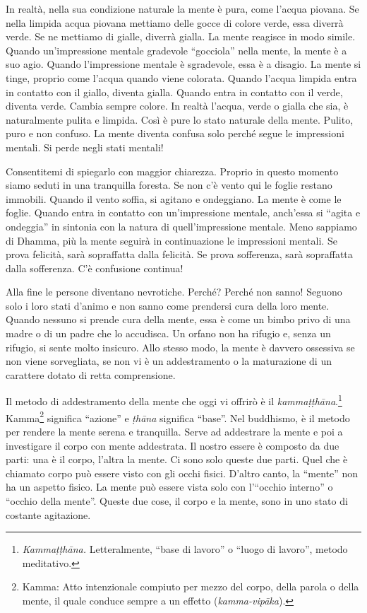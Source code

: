 In realtà, nella sua condizione naturale la mente è pura, come l'acqua
piovana. Se nella limpida acqua piovana mettiamo delle gocce di colore
verde, essa diverrà verde. Se ne mettiamo di gialle, diverrà gialla. La
mente reagisce in modo simile. Quando un'impressione mentale gradevole
``gocciola'' nella mente, la mente è a suo agio. Quando l'impressione
mentale è sgradevole, essa è a disagio. La mente si tinge, proprio come
l'acqua quando viene colorata. Quando l'acqua limpida entra in contatto
con il giallo, diventa gialla. Quando entra in contatto con il verde,
diventa verde. Cambia sempre colore. In realtà l'acqua, verde o gialla
che sia, è naturalmente pulita e limpida. Così è pure lo stato naturale
della mente. Pulito, puro e non confuso. La mente diventa confusa solo
perché segue le impressioni mentali. Si perde negli stati mentali!

Consentitemi di spiegarlo con maggior chiarezza. Proprio in questo
momento siamo seduti in una tranquilla foresta. Se non c'è vento qui le
foglie restano immobili. Quando il vento soffia, si agitano e
ondeggiano. La mente è come le foglie. Quando entra in contatto con
un'impressione mentale, anch'essa si ``agita e ondeggia'' in sintonia
con la natura di quell'impressione mentale. Meno sappiamo di Dhamma, più
la mente seguirà in continuazione le impressioni mentali. Se prova
felicità, sarà sopraffatta dalla felicità. Se prova sofferenza, sarà
sopraffatta dalla sofferenza. C'è confusione continua!

Alla fine le persone diventano nevrotiche. Perché? Perché non sanno!
Seguono solo i loro stati d'animo e non sanno come prendersi cura della
loro mente. Quando nessuno si prende cura della mente, essa è come un
bimbo privo di una madre o di un padre che lo accudisca. Un orfano non
ha rifugio e, senza un rifugio, si sente molto insicuro. Allo stesso
modo, la mente è davvero ossessiva se non viene sorvegliata, se non vi è
un addestramento o la maturazione di un carattere dotato di retta
comprensione.

Il metodo di addestramento della mente che oggi vi offrirò è il
\emph{kammaṭṭhāna}.\footnote{\emph{Kammaṭṭhāna.} Letteralmente, ``base
  di lavoro'' o ``luogo di lavoro'', metodo meditativo.}
Kamma\footnote{Kamma: Atto intenzionale compiuto per mezzo
  del corpo, della parola o della mente, il quale conduce sempre a un
  effetto (\emph{kamma-vipāka}).} significa ``azione'' e \emph{ṭhāna}
significa ``base''. Nel buddhismo, è il metodo per rendere la mente
serena e tranquilla. Serve ad addestrare la mente e poi a investigare il
corpo con mente addestrata. Il nostro essere è composto da due parti:
una è il corpo, l'altra la mente. Ci sono solo queste due parti. Quel
che è chiamato corpo può essere visto con gli occhi fisici. D'altro
canto, la ``mente'' non ha un aspetto fisico. La mente può essere vista
solo con l'``occhio interno'' o ``occhio della mente''. Queste due cose,
il corpo e la mente, sono in uno stato di costante agitazione.

